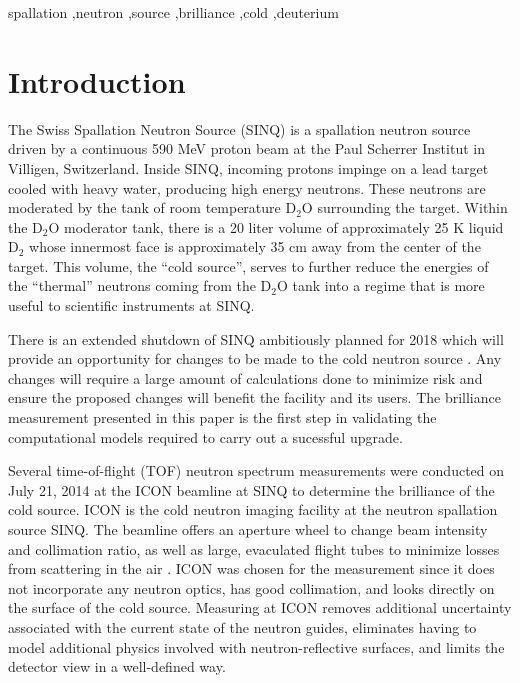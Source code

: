 \documentclass[5p,12pt]{elsarticle}
\begin{document}
\begin{frontmatter}
\begin{abstract}
\end{abstract}

\begin{keyword}
spallation \sep neutron \sep source \sep brilliance \sep cold \sep deuterium


\end{keyword}


\end{frontmatter}



\section{Introduction}
\label{sec:intro}

The Swiss Spallation Neutron Source (SINQ) is a spallation neutron source driven by a continuous 590 MeV proton beam at the Paul Scherrer Institut in Villigen, Switzerland.  Inside SINQ, incoming protons impinge on a lead target cooled with heavy water, producing high energy neutrons.  These neutrons are moderated by the tank of room temperature D$_2$O surrounding the target.  Within the D$_2$O moderator tank, there is a 20 liter volume of approximately 25 K liquid D$_2$ whose innermost face is approximately 35 cm away from the center of the target.  This volume, the ``cold source'', serves to further reduce the energies of the ``thermal'' neutrons coming from the D$_2$O tank into a regime that is more useful to scientific instruments at SINQ.  

There is an extended shutdown of SINQ ambitiously planned for 2018 which will provide an opportunity for changes to be made to the cold neutron source \cite{rueegg_icans}.  Any changes will require a large amount of calculations done to minimize risk and ensure the proposed changes will benefit the facility and its users.  The brilliance measurement presented in this paper is the first step in validating the computational models required to carry out a sucessful upgrade.  

Several time-of-flight (TOF) neutron spectrum measurements were conducted on July 21, 2014 at the ICON beamline at SINQ to determine the brilliance of the cold source.  ICON is the cold neutron imaging facility at the neutron spallation source SINQ.  The beamline offers an aperture wheel to change beam intensity and collimation ratio, as well as large, evaculated flight tubes to minimize losses from scattering in the air \cite{icon}.  ICON was chosen for the measurement since it does not incorporate any neutron optics, has good collimation, and looks directly on the surface of the cold source.  Measuring at ICON removes additional uncertainty associated with the current state of the neutron guides, eliminates having to model additional physics involved with neutron-reflective surfaces, and limits the detector view in a well-defined way.
\end{document}
